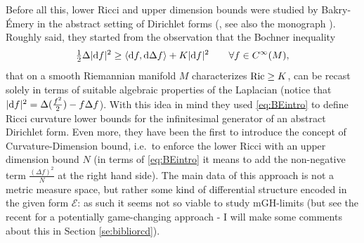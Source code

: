 \documentclass[11pt]{article}
\numberwithin{equation}{section}
\renewcommand{\d}{{\rm d}}
\newcommand\la{\langle}
\newcommand\ra{\rangle}
\newcommand{\Ric}{{\rm Ric}}
\begin{document}
 Before all this, lower Ricci and upper dimension bounds were studied by Bakry-\'Emery in the abstract setting of Dirichlet forms (\cite{BakryEmery85}, see also the monograph \cite{BakryGentilLedoux14}). Roughly said, they started from the observation that the Bochner inequality 
 \begin{equation}
\label{eq:BEintro}
\tfrac12\Delta|\d f|^2\geq \la\d f,\d\Delta f\ra+K|\d f|^2\qquad\forall f\in C^\infty(M),
\end{equation}
that on a smooth Riemannian manifold $M$ characterizes $\Ric\geq K$, can be recast solely in terms of suitable algebraic properties of the Laplacian (notice that $|\d f|^2=\Delta(\tfrac{f^2}2)-f\Delta f$). With this idea in mind they used \eqref{eq:BEintro} to define Ricci curvature lower bounds for the infinitesimal generator of an abstract Dirichlet form. Even more, they have been the first to introduce the concept of Curvature-Dimension bound, i.e.\ to enforce the lower Ricci with  an upper dimension bound $N$   (in terms of \eqref{eq:BEintro} it  means to add the non-negative term $\tfrac{(\Delta f)^2}N$ at the right hand side). The main data of this approach is not a metric measure space, but rather some kind of differential structure encoded in the given form $\mathcal E$: as such it seems not so viable to study mGH-limits (but see the recent \cite{CMTkatoI} for a potentially game-changing approach - I will make some comments about this in Section \ref{se:bibliorcd}).
\end{document}
